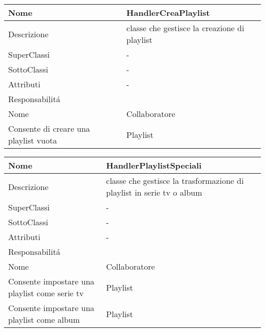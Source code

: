 \begin{center} 
    \begin{longtable}{ |p{3cm}|p{3cm}|p{3cm}|p{3cm}| }
        \hline
        Nome & \multicolumn{3}{|p{9cm}|}{HandlerCreaPlaylist} \\\hline
        Descrizione & \multicolumn{3}{|p{9cm}|}{classe che gestisce la creazione di playlist} \\\hline
        SuperClassi & \multicolumn{3}{|p{9cm}|}{-} \\\hline
        SottoClassi & \multicolumn{3}{|p{9cm}|}{-} \\\hline
        Attributi & \multicolumn{3}{|p{9cm}|}{-} \\\hline
        \multicolumn{4}{|p{12cm}|}{Responsabilit\'a} \\\hline %
        \multicolumn{2}{|p{6cm}|}{Nome} & \multicolumn{2}{|p{6cm}|}{Collaboratore} \\\hline
        \multicolumn{2}{|p{6cm}|}{Consente di creare una playlist vuota} & \multicolumn{2}{|p{6cm}|}{Playlist} \\\hline
    \end{longtable}
\end{center}

\begin{center} 
    \begin{longtable}{ |p{3cm}|p{3cm}|p{3cm}|p{3cm}| }
        \hline
        Nome & \multicolumn{3}{|p{9cm}|}{HandlerPlaylistSpeciali} \\\hline
        Descrizione & \multicolumn{3}{|p{9cm}|}{classe che gestisce la trasformazione di playlist in serie tv o album} \\\hline
        SuperClassi & \multicolumn{3}{|p{9cm}|}{-} \\\hline
        SottoClassi & \multicolumn{3}{|p{9cm}|}{-} \\\hline
        Attributi & \multicolumn{3}{|p{9cm}|}{-} \\\hline
        \multicolumn{4}{|p{12cm}|}{Responsabilit\'a} \\\hline %
        \multicolumn{2}{|p{6cm}|}{Nome} & \multicolumn{2}{|p{6cm}|}{Collaboratore} \\\hline
        \multicolumn{2}{|p{6cm}|}{Consente impostare una playlist come serie tv} & \multicolumn{2}{|p{6cm}|}{Playlist} \\\hline
        \multicolumn{2}{|p{6cm}|}{Consente impostare una playlist come album} & \multicolumn{2}{|p{6cm}|}{Playlist} \\\hline
     \end{longtable}
\end{center}


